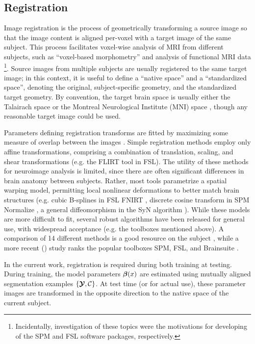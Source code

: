 \subsection{Registration}\label{ss:meth-reg}
Image registration is the process of geometrically transforming a source image so that the image content is aligned per-voxel with a target image of the same subject.
This process facilitates voxel-wise analysis of MRI from different subjects, such as  ``voxel-based morphometry'' \cite{Ashburner2000a} and analysis of functional MRI data \cite{Smith2004}%
\footnote{Incidentally, investigation of these topics were the motivations for developing of the SPM and FSL software packages, respectively.}.
Source images from multiple subjects are usually registered to the same target image; 
in this context, it is useful to define a ``native space'' and a ``standardized space'', denoting the original, subject-specific geometry, and the standardized target geometry.
By convention, the target brain space is usually either the Talairach space \cite{Talairach1988} or the Montreal Neurological Institute (MNI) space \cite{Evans1993}, though any reasonable target image could be used.
\par
Parameters defining registration transforms are fitted by maximizing some measure of overlap between the images \cite{Sotiras2013}.
Simple registration methods employ only affine transformations, comprising a combination of translation, scaling, and shear transformations (e.g. the FLIRT tool \cite{Jenkinson2002} in FSL).
The utility of these methods for neuroimage analysis is limited, since there are often significant differences in brain anatomy between subjects.
Rather, most tools parametrize a spatial warping model, permitting local nonlinear deformations to better match brain structures (e.g.
cubic B-splines in FSL FNIRT \cite{Andersson2007},
discrete cosine transform in SPM Normalize \cite{Ashburner1997,Ashburner2005},
a general diffeomorphism in the SyN algorithm \cite{Avants2008}).
While these models are more difficult to fit, several robust algorithms have been released for general use, with widespread acceptance (e.g. the toolboxes mentioned above).
A \citeyear{Klein2009} comparison of 14 different methods is a good resource on the subject \cite{Klein2009}, while a more recent (\citeyear{Kazemi2014}) study ranks the popular toolboxes SPM, FSL, and Brainsuite \cite{Kazemi2014}.
\par
In the current work, registration is required during both training at testing.
During training, the model parameters $\bm{\beta}(x)$ are estimated using mutually aligned segmentation examples $\{\bm{\mathcal{Y}},\mathcal{C}\}$.
At test time (or for actual use), these parameter images are transformed in the opposite direction to the native space of the current subject.

